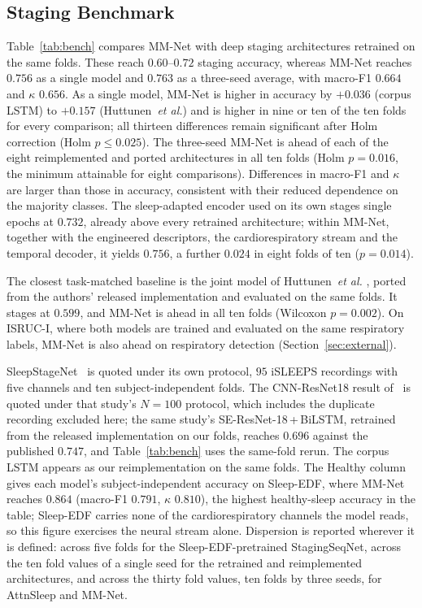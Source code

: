 \documentclass[a4paper,fleqn]{cas-sc}
\newcommand{\mmAcc}{0.763}
\newcommand{\mmAccS}{0.756}
\newcommand{\mmMf}{0.664}
\newcommand{\mmK}{0.656}
\begin{document}
\subsection{Staging Benchmark}
Table~\ref{tab:bench} compares MM-Net with deep staging architectures retrained on the same
folds. These reach $0.60$--$0.72$ staging accuracy, whereas MM-Net reaches $\mmAccS$ as a single
model and $\mmAcc$ as a three-seed average, with macro-F1 $\mmMf$ and $\kappa$ $\mmK$. As a
single model, MM-Net is higher in accuracy by $+0.036$ (corpus LSTM) to $+0.157$
(Huttunen~\emph{et al.}) and is higher in nine or ten of the ten folds for every comparison; all
thirteen differences remain significant after Holm correction (Holm $p\leq0.025$). The three-seed
MM-Net is ahead of each of the eight reimplemented and ported architectures in all ten folds
(Holm $p=0.016$, the minimum attainable for eight comparisons). Differences in macro-F1 and
$\kappa$ are larger than those in accuracy, consistent with their reduced dependence on the
majority classes. The sleep-adapted encoder used on its own stages single epochs at $0.732$,
already above every retrained architecture; within MM-Net, together with the engineered
descriptors, the cardiorespiratory stream and the temporal decoder, it yields $\mmAccS$, a further
$0.024$ in eight folds of ten ($p=0.014$).

The closest task-matched baseline is the joint model of Huttunen~\emph{et al.}
\cite{huttunen2023simultaneous}, ported from the authors' released implementation and evaluated
on the same folds. It stages at $0.599$, and MM-Net is ahead in all ten folds (Wilcoxon
$p=0.002$). On ISRUC-I, where both models are
trained and evaluated on the same respiratory labels, MM-Net is also ahead on respiratory
detection (Section~\ref{sec:external}).

SleepStageNet~\cite{alhazmi2026sleepstagenet} is quoted under its own protocol, $95$ iSLEEPS
recordings with five channels and ten subject-independent folds. The CNN-ResNet18 result
of~\cite{bose2026gap} is quoted under that study's $N=100$ protocol,
which includes the duplicate recording excluded here; the same study's SE-ResNet-18\,+\,BiLSTM,
retrained from the released implementation on our folds, reaches $0.696$ against the published
$0.747$, and Table~\ref{tab:bench} uses the same-fold rerun. The corpus LSTM appears as our
reimplementation on the same folds. The Healthy column gives each
model's subject-independent accuracy on Sleep-EDF, where MM-Net reaches $0.864$ (macro-F1
$0.791$, $\kappa$ $0.810$), the highest healthy-sleep accuracy in the table; Sleep-EDF carries
none of the cardiorespiratory channels the model reads, so this figure exercises the neural
stream alone. Dispersion is reported wherever it is defined: across five folds for the
Sleep-EDF-pretrained StagingSeqNet, across the ten fold values of a single seed for the retrained
and reimplemented architectures, and across the thirty fold values, ten folds by three seeds, for
AttnSleep and MM-Net.
\end{document}
